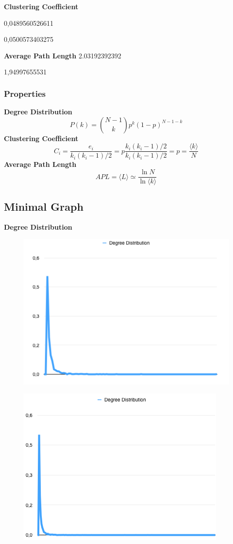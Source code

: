 \documentclass[a4paper,titlepage,11pt]{article}
\begin{document}
\textbf{Clustering Coefficient}

0,0489560526611

0,0500573403275

\textbf{Average Path Length}
2.03192392392

1,94997655531


\subsubsection{Properties}
\textbf{Degree Distribution}
\[
  P(k) = {{N-1}\choose{k}} p^{k}(1-p)^{N-1-k}
\]
\textbf{Clustering Coefficient}
\[
  C_i = \frac{e_i}{k_i(k_i-1)/2} = p \frac{k_i(k_i-1)/2}{k_i(k_i-1)/2} = p = \frac{\langle k\rangle}{N}
\]
\textbf{Average Path Length}
\[
  APL = \langle L\rangle \simeq \frac{\ln{N}}{\ln{\langle k\rangle}}
\]

\subsection{Minimal Graph}
\textbf{Degree Distribution}

\begin{figure}[h]
    \centering
    \includegraphics[scale=0.50]{img/dd-minimal-3-1000.png}
\end{figure}

\begin{figure}[h]
    \centering
    \includegraphics[scale=0.50]{img/dd-minimal-3-5000.png}
\end{figure}
\end{document}
